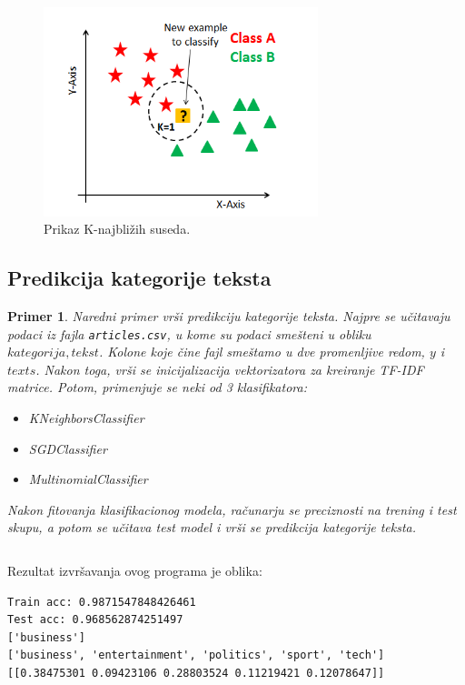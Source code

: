 \documentclass[a4paper]{article}
\newtheorem{primer}{Primer}[section]
\begin{document}
\begin{figure}[t]
\includegraphics[width=8cm]{Pictures/slika2.png}
\centering
\caption{Prikaz K-najbližih suseda.}
\end{figure}
\newpage
\subsection{Predikcija kategorije teksta}
\begin{primer}
Naredni primer vrši predikciju kategorije teksta. Najpre se učitavaju podaci iz fajla \texttt{articles.csv}, u kome su podaci smešteni u obliku $kategorija, tekst$. Kolone koje čine fajl smeštamo u dve promenljive redom, $y$ i $texts$. Nakon toga, vrši se inicijalizacija vektorizatora za kreiranje TF-IDF matrice. Potom, primenjuje se neki od 3 klasifikatora:
\begin{itemize}
\item KNeighborsClassifier
\item SGDClassifier
\item MultinomialClassifier
\end{itemize}
Nakon fitovanja klasifikacionog modela, računarju se preciznosti na trening i test skupu, a potom se učitava test model i vrši se predikcija kategorije teksta. 
\end{primer}
\inputminted{python}{Codes/1/classifier.py}
Rezultat izvršavanja ovog programa je oblika:
\begin{lstlisting}
Train acc: 0.9871547848426461
Test acc: 0.968562874251497
['business']
['business', 'entertainment', 'politics', 'sport', 'tech']
[[0.38475301 0.09423106 0.28803524 0.11219421 0.12078647]]
\end{lstlisting}
\newpage
\end{document}
